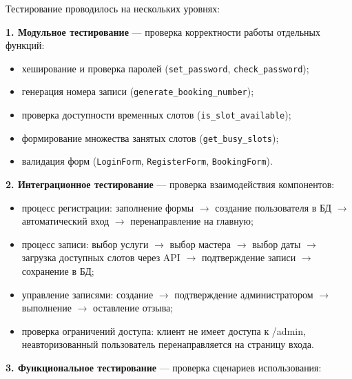 \documentclass[14pt,a4paper,oneside]{extarticle}
\begin{document}
Тестирование проводилось на нескольких уровнях:

\textbf{1. Модульное тестирование} --- проверка корректности работы отдельных функций:
\begin{itemize}[leftmargin=2cm]
    \item хеширование и проверка паролей (\texttt{set\_password}, \texttt{check\_password});
    \item генерация номера записи (\texttt{generate\_booking\_number});
    \item проверка доступности временных слотов (\texttt{is\_slot\_available});
    \item формирование множества занятых слотов (\texttt{get\_busy\_slots});
    \item валидация форм (\texttt{LoginForm}, \texttt{RegisterForm}, \texttt{BookingForm}).
\end{itemize}

\textbf{2. Интеграционное тестирование} --- проверка взаимодействия компонентов:
\begin{itemize}[leftmargin=2cm]
    \item процесс регистрации: заполнение формы $\rightarrow$ создание пользователя в БД $\rightarrow$ автоматический вход $\rightarrow$ перенаправление на главную;
    \item процесс записи: выбор услуги $\rightarrow$ выбор мастера $\rightarrow$ выбор даты $\rightarrow$ загрузка доступных слотов через API $\rightarrow$ подтверждение записи $\rightarrow$ сохранение в БД;
    \item управление записями: создание $\rightarrow$ подтверждение администратором $\rightarrow$ выполнение $\rightarrow$ оставление отзыва;
    \item проверка ограничений доступа: клиент не имеет доступа к /admin, неавторизованный пользователь перенаправляется на страницу входа.
\end{itemize}

\textbf{3. Функциональное тестирование} --- проверка сценариев использования:
\end{document}
